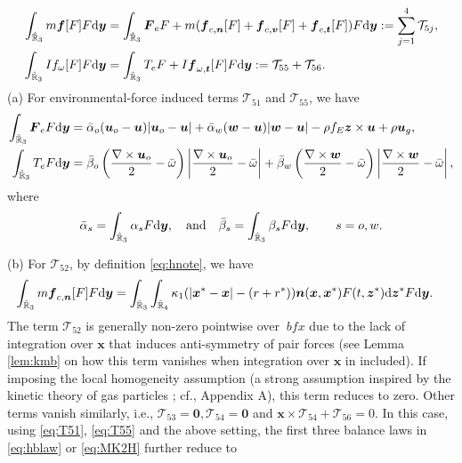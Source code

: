 \documentclass[a4paper,11pt]{article}
\numberwithin{equation}{section}
\theoremstyle{definition}
\newcommand{\bfx}{\boldsymbol{x}}
\newcommand{\bfz}{\boldsymbol{z}}
\newcommand{\bfy}{\boldsymbol{y}}
\newcommand{\bfzr}{\boldsymbol{0}}
\newcommand{\bfv}{\boldsymbol{v}}
\newcommand{\bfn}{\boldsymbol{n}}
\newcommand{\bft}{\boldsymbol{t}}
\newcommand{\bfu}{\boldsymbol{u}_o}
\newcommand{\bfuu}{\boldsymbol{u}}
\newcommand{\bff}{\boldsymbol{f}}
\newcommand{\bfF}{\boldsymbol{F}}
\newcommand{\bfw}{\boldsymbol{w}}
\newcommand{\bbr}{\mathbb R}
\def\d{{  \rm d}}
\newcommand{\T}{\mathcal{T}}
\begin{document}
\begin{align}
\int_{\hat{\bbr}_3} m \bff[F] F \d\bfy
&=\int_{\hat{\bbr}_3} \bfF_e F + m ( \bff_{c,\bfn}[F] +  \bff_{c,\bfv}[F] +  \bff_{c,\bft}[F] ) F \d\bfy := \sum_{j=1}^4 \T_{5j}, \label{eq:T5j1}\\
\int_{\hat{\bbr}_3} I f_\omega[F] F \d\bfy
&=\int_{\hat{\bbr}_3} T_e F + I  \bff_{\omega,\bft}[F] F \d\bfy:= \T_{55} + \T_{56}. \label{eq:T5j2}
\end{align}
%
(a) For environmental-force induced terms $\T_{51}$ and $\T_{55}$, we have
\begin{align}
    \int_{\hat{\bbr}_3} \bfF_e F\d \bfy &= \bar\alpha_o (\bfu-\bfuu)|\bfu-\bfuu| + \bar\alpha_w (\bfw-\bfuu)|\bfw-\bfuu| - \rho f_E \bfz \times \bfuu + \rho \bfuu_g,  \label{eq:T51} \\
    \int_{\hat{\bbr}_3} T_e F\d\bfy & = \bar\beta_o \left(\frac{\nabla\times\bfu}{2}-\bar\omega\right)\left|\frac{\nabla\times\bfu}{2}-\bar\omega\right| + \bar\beta_w \left(\frac{\nabla\times\bfw}{2}-\bar\omega\right)\left|\frac{\nabla\times\bfw}{2}-\bar\omega\right|, 
    \label{eq:T55}
\end{align}
where 
\[
\bar\alpha_s = \int_{\hat{\bbr}_3} \alpha_s F \d \bfy,\quad\text{and}\quad \bar\beta_s = \int_{\hat{\bbr}_3} \beta_s F \d \bfy, \qquad s = o, w.
\]


\noindent
(b) For $\T_{52}$, by definition \eqref{eq:hnote}, we have
\begin{align} \label{eq:T52}
    \int_{\hat{\bbr}_3} m\bff_{c,\bfn}[F] F\d \bfy &= \int_{\hat{\bbr}_3} \int_{\hat{\bbr}_4}  \kappa_1 (|\bfx^* - \bfx| - (r + r^*)) \bfn(\bfx, \bfx^*)  F(t, \bfz^*)\d\bfz^* F\d \bfy.
\end{align}
The term $\T_{52}$ is generally non-zero pointwise over $ \ bfx$ due to the lack of integration over $\bfx$ that induces anti-symmetry of pair forces (see Lemma \ref{lem:kmb} on how this term vanishes when integration over $\bfx$ in included). If imposing the local homogeneity assumption (a strong assumption inspired by the kinetic theory of gas particles \cite{bardos1991fluid, golse2003mean, golse2005boltzmann}; cf., Appendix A), this term reduces to zero. Other terms vanish similarly, i.e., $\T_{53} = \bfzr, \T_{54} = \bfzr$ and $\bfx \times \T_{54} + \T_{56} = 0$. 
%
In this case, using \eqref{eq:T51}, \eqref{eq:T55} and the above setting, the first three balance laws in \eqref{eq:hblaw} or \eqref{eq:MK2H} further reduce to
\end{document}

